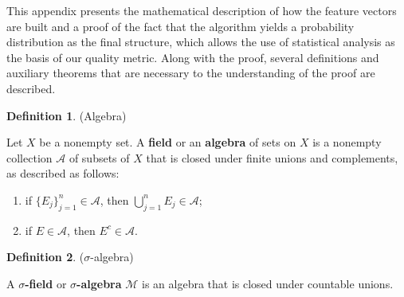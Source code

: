 This appendix presents the mathematical description of how the feature vectors are built and a proof of the fact that the algorithm yields a probability distribution as the final structure, which allows the use of statistical analysis as the basis of our quality metric. Along with the proof, several definitions and auxiliary theorems that are necessary to the understanding of the proof are described.

\vspace{0.1in}

\theoremstyle{definition}
\newtheorem{definition}{Definition}
\begin{definition}{(Algebra) \cite{folland2013real}}

Let $X$ be a nonempty set. A \textbf{field} or an \textbf{algebra} of sets on $X$ is a nonempty collection $\mathcal{A}$ of subsets of $X$ that is closed under finite unions and complements, as described as follows:

\begin{enumerate}[label=(\roman*)]
    \item if $\{E_{j}\}_{j = 1}^{n} \in \mathcal{A}$, then $\bigcup_{j = 1}^{n}E_{j} \in \mathcal{A}$;
    
    \item if $E \in \mathcal{A}$, then $E^{c} \in \mathcal{A}$.
    
\end{enumerate}
\end{definition}
\vspace{0.1in}

\begin{definition}{($\sigma$-algebra) \cite{folland2013real}}

A \textbf{$\sigma$-field} or \textbf{$\sigma$-algebra} $\mathcal{M}$ is an algebra that is closed under countable unions.
\end{definition}

\vspace{0.1in}

